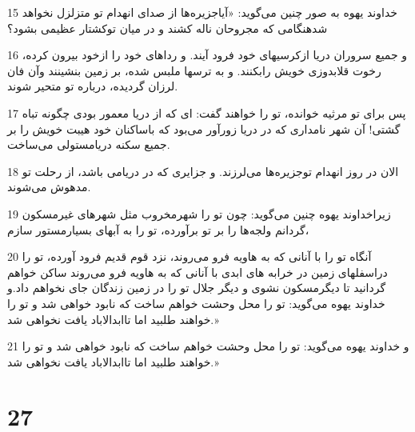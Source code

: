 \par 15 خداوند یهوه به صور چنین می‌گوید: «آیاجزیره‌ها از صدای انهدام تو متزلزل نخواهد شدهنگامی که مجروحان ناله کشند و در میان توکشتار عظیمی بشود؟
\par 16 و جمیع سروران دریا ازکرسیهای خود فرود آیند. و رداهای خود را ازخود بیرون کرده، رخوت قلابدوزی خویش رابکنند. و به ترسها ملبس شده، بر زمین بنشینند وآن فان لرزان گردیده، درباره تو متحیر شوند.
\par 17 پس برای تو مرثیه خوانده، تو را خواهند گفت: ای که از دریا معمور بودی چگونه تباه گشتی! آن شهر نامداری که در دریا زورآور می‌بود که باساکنان خود هیبت خویش را بر جمیع سکنه دریامستولی می‌ساخت.
\par 18 الان در روز انهدام توجزیره‌ها می‌لرزند. و جزایری که در دریامی باشد، از رحلت تو مدهوش می‌شوند.
\par 19 زیراخداوند یهوه چنین می‌گوید: چون تو را شهرمخروب مثل شهرهای غیرمسکون گردانم ولجه‌ها را بر تو برآورده، تو را به آبهای بسیارمستور سازم،
\par 20 آنگاه تو را با آنانی که به هاویه فرو می‌روند، نزد قوم قدیم فرود آورده، تو را دراسفلهای زمین در خرابه های ابدی با آنانی که به هاویه فرو می‌روند ساکن خواهم گردانید تا دیگرمسکون نشوی و دیگر جلال تو را در زمین زندگان جای نخواهم داد.و خداوند یهوه می‌گوید: تو را محل وحشت خواهم ساخت که نابود خواهی شد و تو را خواهند طلبید اما تاابدالاباد یافت نخواهی شد.»
\par 21 و خداوند یهوه می‌گوید: تو را محل وحشت خواهم ساخت که نابود خواهی شد و تو را خواهند طلبید اما تاابدالاباد یافت نخواهی شد.»

\chapter{27}

